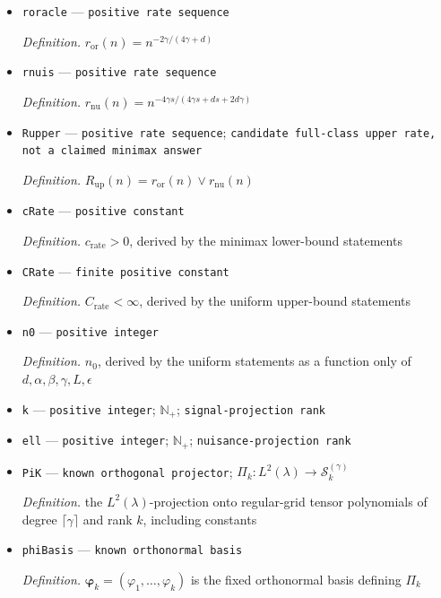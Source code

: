 \documentclass{article}
\begin{document}
\begin{itemize}
  \par\smallskip\noindent\emph{Definition.} \(s=\alpha+\beta\)
  \item \texttt{roracle} --- \texttt{positive rate sequence}
  \par\smallskip\noindent\emph{Definition.} \(r_{\mathrm{or}}(n)=n^{-2\gamma/(4\gamma+d)}\)
  \item \texttt{rnuis} --- \texttt{positive rate sequence}
  \par\smallskip\noindent\emph{Definition.} \(r_{\mathrm{nu}}(n)=n^{-4\gamma s/(4\gamma s+d s+2d\gamma)}\)
  \item \texttt{Rupper} --- \texttt{positive rate sequence}; \texttt{candidate full-\allowbreak{}class upper rate,\allowbreak{} not a claimed minimax answer}
  \par\smallskip\noindent\emph{Definition.} \(R_{\mathrm{up}}(n)=r_{\mathrm{or}}(n)\vee r_{\mathrm{nu}}(n)\)
  \item \texttt{cRate} --- \texttt{positive constant}
  \par\smallskip\noindent\emph{Definition.} \(c_{\mathrm{rate}}>0\), derived by the minimax lower-bound statements
  \item \texttt{CRate} --- \texttt{finite positive constant}
  \par\smallskip\noindent\emph{Definition.} \(C_{\mathrm{rate}}<\infty\), derived by the uniform upper-bound statements
  \item \texttt{n0} --- \texttt{positive integer}
  \par\smallskip\noindent\emph{Definition.} \(n_0\), derived by the uniform statements as a function only of \(d,\alpha,\beta,\gamma,L,\epsilon\)
  \item \texttt{k} --- \texttt{positive integer}; \(\mathbb N_{+}\); \texttt{signal-\allowbreak{}projection rank}
  \item \texttt{ell} --- \texttt{positive integer}; \(\mathbb N_{+}\); \texttt{nuisance-\allowbreak{}projection rank}
  \item \texttt{PiK} --- \texttt{known orthogonal projector}; \(\Pi_k:L^2(\lambda)\to\mathcal S_k^{(\gamma)}\)
  \par\smallskip\noindent\emph{Definition.} the \(L^2(\lambda)\)-projection onto regular-grid tensor polynomials of degree \(\lceil\gamma\rceil\) and rank \(k\), including constants
  \item \texttt{phiBasis} --- \texttt{known orthonormal basis}
  \par\smallskip\noindent\emph{Definition.} \(\boldsymbol\varphi_k=(\varphi_1,\ldots,\varphi_k)\) is the fixed orthonormal basis defining \(\Pi_k\)

\end{itemize}
\end{document}
